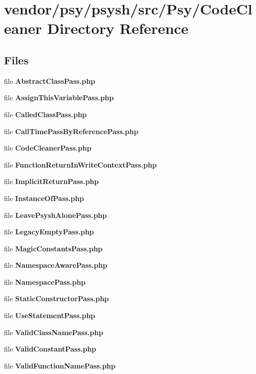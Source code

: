 \section{vendor/psy/psysh/src/\+Psy/\+Code\+Cleaner Directory Reference}
\label{dir_b6e604eddd2bf859be41d1a6f1b51f5a}
\subsection*{Files}
\begin{DoxyCompactItemize}
\item 
file {\bf Abstract\+Class\+Pass.\+php}
\item 
file {\bf Assign\+This\+Variable\+Pass.\+php}
\item 
file {\bf Called\+Class\+Pass.\+php}
\item 
file {\bf Call\+Time\+Pass\+By\+Reference\+Pass.\+php}
\item 
file {\bf Code\+Cleaner\+Pass.\+php}
\item 
file {\bf Function\+Return\+In\+Write\+Context\+Pass.\+php}
\item 
file {\bf Implicit\+Return\+Pass.\+php}
\item 
file {\bf Instance\+Of\+Pass.\+php}
\item 
file {\bf Leave\+Psysh\+Alone\+Pass.\+php}
\item 
file {\bf Legacy\+Empty\+Pass.\+php}
\item 
file {\bf Magic\+Constants\+Pass.\+php}
\item 
file {\bf Namespace\+Aware\+Pass.\+php}
\item 
file {\bf Namespace\+Pass.\+php}
\item 
file {\bf Static\+Constructor\+Pass.\+php}
\item 
file {\bf Use\+Statement\+Pass.\+php}
\item 
file {\bf Valid\+Class\+Name\+Pass.\+php}
\item 
file {\bf Valid\+Constant\+Pass.\+php}
\item 
file {\bf Valid\+Function\+Name\+Pass.\+php}
\end{DoxyCompactItemize}
